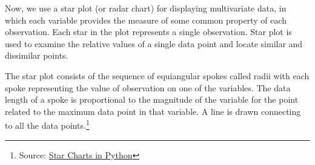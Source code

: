\documentclass[a4paper]{article}
\newcommand{\highspace}{\vspace{1.2em}\noindent}
\begin{document}
    \noindent
    Now, we use a star plot (or radar chart) for displaying multivariate data, in which each variable provides the measure of some common property of each observation. Each star in the plot represents a single observation. Star plot is used to examine the relative values of a single data point and locate similar and dissimilar points.

    \highspace
    The star plot consists of the sequence of equiangular spokes called radii with each spoke representing the value of observation on one of the variables. The data length of a spoke is proportional to the magnitude of the variable for the point related to the maximum data point in that variable. A line is drawn connecting to all the data points.\footnote{Source: \href{https://www.geeksforgeeks.org/star-charts-in-python/}{Star Charts in Python}}
\end{document}
